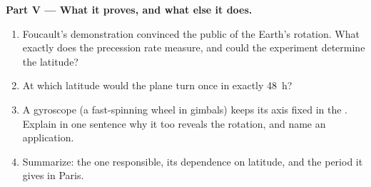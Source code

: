 \begin{problem}
\medskip
\noindent\textbf{Part V --- What it proves, and what else it does.}
\begin{enumerate}[resume]
  \item Foucault's demonstration convinced the public of the Earth's
        rotation. What exactly does the precession rate measure, and
        could the experiment determine the latitude?
  \item At which latitude would the plane turn once in exactly \qty{48}{h}?
  \item A gyroscope (a fast-spinning wheel in gimbals) keeps its axis
        fixed in the . Explain in one sentence why it too
        reveals the rotation, and name an application.
  \item Summarize: the one  responsible, its dependence on
        latitude, and the period it gives in Paris.
\end{enumerate}
\end{problem}
